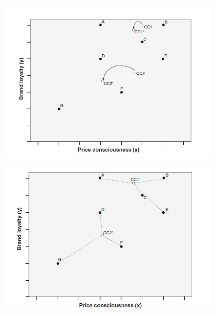 \documentclass[a4paper,12pt]{article}
\begin{document}
\begin{figure}[h!]
	\begin{center}
		\includegraphics[scale=0.4]{images/kmeans3.jpg}\\
	\end{center}
\end{figure}
\begin{figure}[h!]
	\begin{center}
		\includegraphics[scale=0.4]{images/kmeans4.jpg}\\
	\end{center}
\end{figure}
\end{document}

